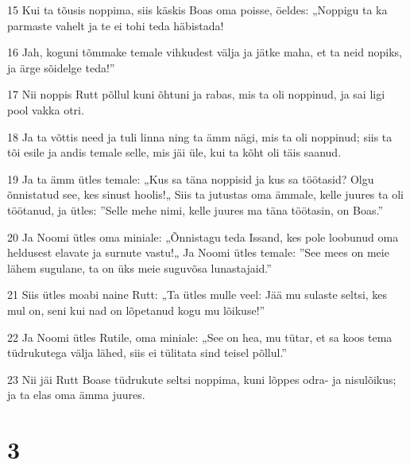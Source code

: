 \par 15 Kui ta tõusis noppima, siis käskis Boas oma poisse, öeldes: „Noppigu ta ka parmaste vahelt ja te ei tohi teda häbistada!
\par 16 Jah, koguni tõmmake temale vihkudest välja ja jätke maha, et ta neid nopiks, ja ärge sõidelge teda!”
\par 17 Nii noppis Rutt põllul kuni õhtuni ja rabas, mis ta oli noppinud, ja sai ligi pool vakka otri.
\par 18 Ja ta võttis need ja tuli linna ning ta ämm nägi, mis ta oli noppinud; siis ta tõi esile ja andis temale selle, mis jäi üle, kui ta kõht oli täis saanud.
\par 19 Ja ta ämm ütles temale: „Kus sa täna noppisid ja kus sa töötasid? Olgu õnnistatud see, kes sinust hoolis!„ Siis ta jutustas oma ämmale, kelle juures ta oli töötanud, ja ütles: ”Selle mehe nimi, kelle juures ma täna töötasin, on Boas.”
\par 20 Ja Noomi ütles oma miniale: „Õnnistagu teda Issand, kes pole loobunud oma heldusest elavate ja surnute vastu!„ Ja Noomi ütles temale: ”See mees on meie lähem sugulane, ta on üks meie suguvõsa lunastajaid.”
\par 21 Siis ütles moabi naine Rutt: „Ta ütles mulle veel: Jää mu sulaste seltsi, kes mul on, seni kui nad on lõpetanud kogu mu lõikuse!”
\par 22 Ja Noomi ütles Rutile, oma miniale: „See on hea, mu tütar, et sa koos tema tüdrukutega välja lähed, siis ei tülitata sind teisel põllul.”
\par 23 Nii jäi Rutt Boase tüdrukute seltsi noppima, kuni lõppes odra- ja nisulõikus; ja ta elas oma ämma juures.

\chapter{3}

